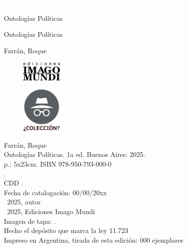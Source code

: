 \newpage
\thispagestyle{empty}
{\textcolor{white}{.}}

\vspace{30mm}

\begin{center}
	\LARGE{Ontologías Políticas}
\end{center}

\newpage
\thispagestyle{empty}

\vspace{30mm}

\begin{center}
\LARGE{Ontologías Políticas}\\\vspace{10mm}

\Large{Farrán, Roque}
\end{center}

\vfill

\begin{figure}[b]
\centering
\includegraphics[width=20mm]{./media/logo-imago-ByW.png}
\end{figure}

\newpage
\thispagestyle{empty}
\begin{figure}[t]
\centering
\vspace{-10mm}
\includegraphics[width=20mm]{./media/desconocido.png}\\
\end{figure}

\noindent Farrán, Roque \\
\noindent Ontologías Políticas. 1a ed. Buenos Aires: 2025.\\
 p.; \15x23cm. ISBN 978-950-793-000-0 \\
. \\
\noindent CDD .\\
\noindent Fecha de catalogación: 00/00/20xx \\
\noindent \textcopyright~2025, autor \\
\noindent \textcopyright~2025, Ediciones Imago Mundi\\
\noindent Imagen de tapa: .\\
\noindent Hecho el depósito que marca la ley 11.723\\
\noindent Impreso en Argentina, tirada de esta edición: 000 ejemplares\\

